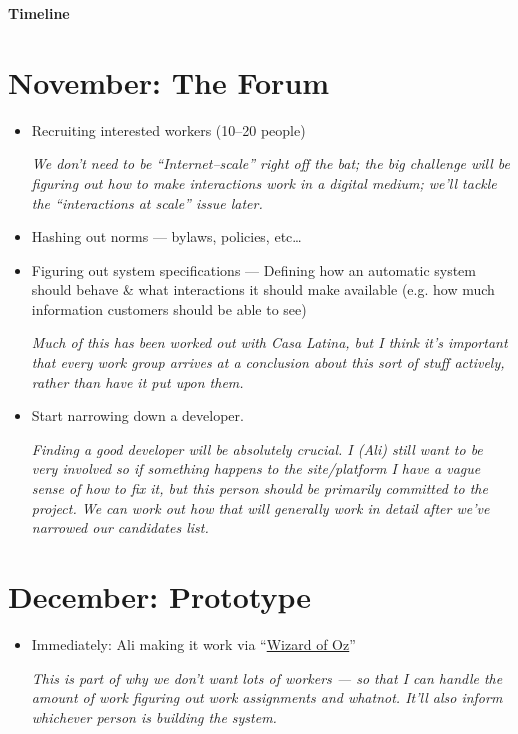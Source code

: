 \documentclass[11pt]{article}
\begin{document}
  \begin{center}
  \Large{\textbf{Timeline}}
  \end{center}

\section*{November: The Forum}
  \begin{itemize}
    \item Recruiting interested workers (10--20 people)

    \textit{We don't need to be ``Internet--scale'' right off the bat; the big challenge will be figuring out how to make interactions work in a digital medium; we'll tackle the ``interactions at scale'' issue later.}
    \item Hashing out norms ---
    bylaws, policies, etc\dots
    \item Figuring out system specifications ---
    Defining how an automatic system should behave \& what interactions it should make available
    (e.g. how much information customers should be able to see)

    \textit{Much of this has been worked out with Casa Latina, but I think it's important that every work group arrives at a conclusion about this sort of stuff actively, rather than have it put upon them.}
    \item Start narrowing down a developer.

    \textit{Finding a good developer will be absolutely crucial.
    I (Ali) still want to be very involved so if something happens to the site/platform I have a vague sense of how to fix it,
    but this person should be primarily committed to the project.
    We can work out how that will generally work in detail after we've narrowed our candidates list.}
  \end{itemize}
\section*{December: Prototype}
  \begin{itemize}
    \item Immediately: Ali making it work via ``\href{https://en.wikipedia.org/wiki/Wizard_of_Oz_experiment}{Wizard of Oz}''

    \textit{This is part of why we don't want lots of workers --- so that I can handle the amount of work figuring out work assignments and whatnot. It'll also inform whichever person is building the system.}
  \end{itemize}
\end{document}
